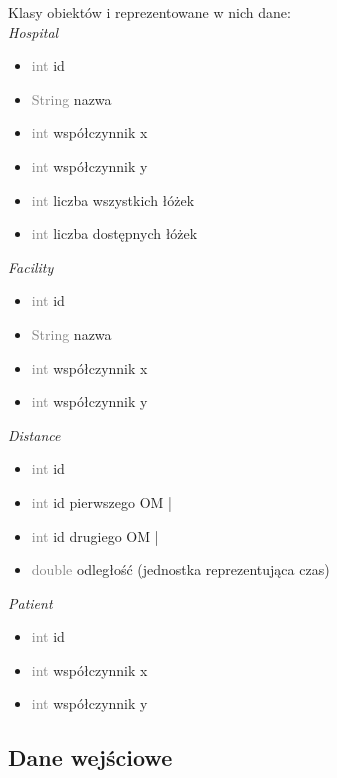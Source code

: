\documentclass[]{article}
\begin{document}
    Klasy obiektów i reprezentowane w nich dane:\\


    \textit{Hospital}
    \begin{itemize}
        \item  \textcolor{gray}{int} id
        \item  \textcolor{gray}{String} nazwa
        \item  \textcolor{gray}{int} współczynnik x
        \item \textcolor{gray}{int}  współczynnik y
        \item \textcolor{gray}{int}  liczba wszystkich łóżek
        \item \textcolor{gray}{int}  liczba dostępnych łóżek
    \end{itemize}

    \textit{Facility}
    \begin{itemize}
        \item  \textcolor{gray}{int} id
        \item  \textcolor{gray}{String}  nazwa
        \item  \textcolor{gray}{int}  współczynnik x
        \item \textcolor{gray}{int}  współczynnik y
    \end{itemize}

    \textit{Distance}
    \begin{itemize}
        \item \textcolor{gray}{int}  id
        \item  \textcolor{gray}{int} id pierwszego OM |
        \item  \textcolor{gray}{int} id drugiego OM |
        \item \textcolor{gray}{double}  odległość (jednostka reprezentująca czas)
    \end{itemize}

    \textit{Patient}
    \begin{itemize}
        \item  \textcolor{gray}{int} id
        \item \textcolor{gray}{int}  współczynnik x
        \item \textcolor{gray}{int}  współczynnik y
    \end{itemize}

    \subsection{Dane wejściowe} %
\end{document}
